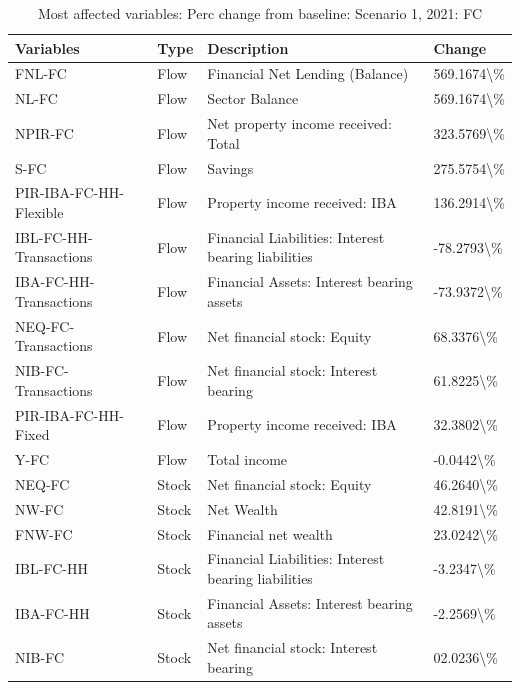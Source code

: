\documentclass[
]{book}
\begin{document}
\begin{table}

\caption{\label{tab:most-affected-scenario-1-perc-2020-FC}Most affected variables: Perc change from baseline: Scenario 1, 2021: FC}
\centering
\fontsize{10}{12}\selectfont
\begin{tabular}[t]{l|l|l|l}
\hline
Variables & Type & Description & Change\\
\hline
FNL-FC & Flow & Financial Net Lending (Balance) & 569.1674\textbackslash{}\%\\
\hline
NL-FC & Flow & Sector Balance & 569.1674\textbackslash{}\%\\
\hline
NPIR-FC & Flow & Net property income received: Total & 323.5769\textbackslash{}\%\\
\hline
S-FC & Flow & Savings & 275.5754\textbackslash{}\%\\
\hline
PIR-IBA-FC-HH-Flexible & Flow & Property income received: IBA & 136.2914\textbackslash{}\%\\
\hline
IBL-FC-HH-Transactions & Flow & Financial Liabilities: Interest bearing liabilities & -78.2793\textbackslash{}\%\\
\hline
IBA-FC-HH-Transactions & Flow & Financial Assets: Interest bearing assets & -73.9372\textbackslash{}\%\\
\hline
NEQ-FC-Transactions & Flow & Net financial stock: Equity & 68.3376\textbackslash{}\%\\
\hline
NIB-FC-Transactions & Flow & Net financial stock: Interest bearing & 61.8225\textbackslash{}\%\\
\hline
PIR-IBA-FC-HH-Fixed & Flow & Property income received: IBA & 32.3802\textbackslash{}\%\\
\hline
Y-FC & Flow & Total income & -0.0442\textbackslash{}\%\\
\hline
NEQ-FC & Stock & Net financial stock: Equity & 46.2640\textbackslash{}\%\\
\hline
NW-FC & Stock & Net Wealth & 42.8191\textbackslash{}\%\\
\hline
FNW-FC & Stock & Financial net wealth & 23.0242\textbackslash{}\%\\
\hline
IBL-FC-HH & Stock & Financial Liabilities: Interest bearing liabilities & -3.2347\textbackslash{}\%\\
\hline
IBA-FC-HH & Stock & Financial Assets: Interest bearing assets & -2.2569\textbackslash{}\%\\
\hline
NIB-FC & Stock & Net financial stock: Interest bearing & 02.0236\textbackslash{}\%\\
\hline
\end{tabular}
\end{table}
\end{document}
